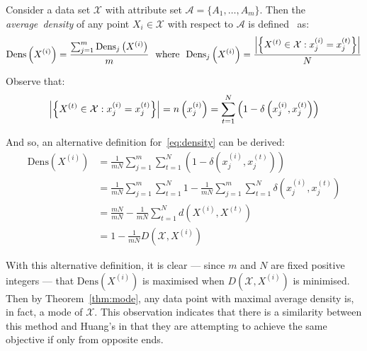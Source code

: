 \begin{definition}\label{def:density}	
    Consider a data set \(\mathcal{X}\) with attribute set \(\mathcal{A} = 
    \{A_1, \ldots, A_m\}\). Then the \emph{average~density} of any point 
    \(X_i \in \mathcal{X}\) with respect to \(\mathcal{A}\) is 
    defined~\cite{Cao2009} as:
    \begin{equation}\label{eq:density}
        \text{Dens}\left(X^{(i)}\right) = \frac{%
            \sum_{j=1}^m \text{Dens}_{j}\left(X^{(i)}\right)
        }{m}
        \ \ \text{where} \ \
        \text{Dens}_{j}\left(X^{(i)}\right) = \frac{%
            \abs*{%
                \left\{X^{(t)} \in \mathcal{X} : x_j^{(i)} = x_j^{(t)}\right\}
            }
        }{N}
    \end{equation}

    Observe that:
    \[
        \abs*{\left\{X^{(t)} \in \mathcal{X} : x_j^{(i)} = x_j^{(t)}\right\}}%
        = n\left(x_j^{(i)}\right)%
        = \sum_{t=1}^N \left(1 - \delta\left(x_j^{(i)}, x_j^{(t)}\right)\right)
    \]

    And so, an alternative definition for~\eqref{eq:density} can be derived:
    \begin{equation}\label{eq:density-alt}
    \begin{aligned}
        \text{Dens}\left(X^{(i)}\right)
        & = \frac{1}{mN} \sum_{j=1}^m \sum_{t=1}^N \left(%
            1 - \delta\left(x_j^{(i)}, x_j^{(t)}\right)
        \right)\\
        & = \frac{1}{mN} \sum_{j=1}^m \sum_{t=1}^N 1%
            - \frac{1}{mN} \sum_{j=1}^m \sum_{t=1}^N
            \delta\left(x_j^{(i)}, x_j^{(t)}\right)\\
        & = \frac{mN}{mN} - \frac{1}{mN} \sum_{t=1}^N
            d\left(X^{(i)}, X^{(t)}\right)\\
        & = 1 - \frac{1}{mN} D\left(\mathcal{X}, X^{(i)}\right)
    \end{aligned}
    \end{equation}

    With this alternative definition, it is clear --- since \(m\) and \(N\) are
    fixed positive integers --- that \(\text{Dens}(X^{(i)})\) is maximised when
    \(D(\mathcal{X}, X^{(i)})\) is minimised. Then by Theorem~\ref{thm:mode},
    any data point with maximal average density is, in fact, a mode of
    \(\mathcal{X}\). This observation indicates that there is a similarity
    between this method and Huang's in that they are attempting to achieve the
    same objective if only from opposite ends.
\end{definition}


%
